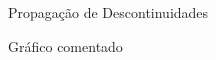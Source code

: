\documentclass{beamer}
\theoremstyle{plain}
\theoremstyle{definition}
\begin{document}
\begin{frame}{Propagação de Descontinuidades}
     
    {\color{red} \Huge Gráfico comentado}



\end{frame}
\end{document}
